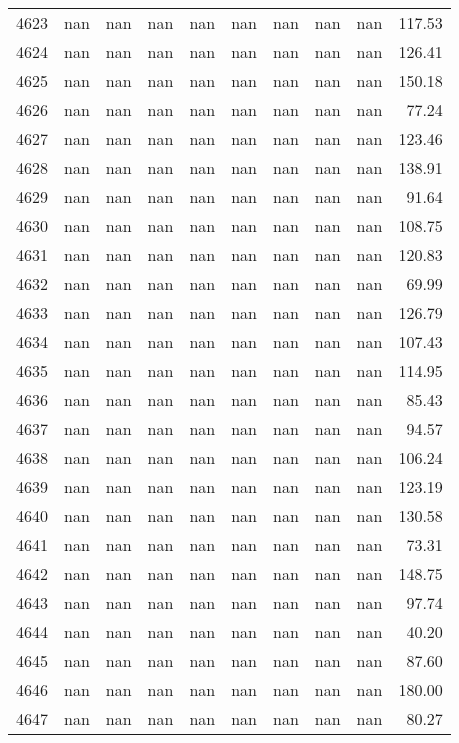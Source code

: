 \begin{tabular}{lrrrrrrrrr}
4623 & nan & nan & nan & nan & nan & nan & nan & nan & 117.53 \\
4624 & nan & nan & nan & nan & nan & nan & nan & nan & 126.41 \\
4625 & nan & nan & nan & nan & nan & nan & nan & nan & 150.18 \\
4626 & nan & nan & nan & nan & nan & nan & nan & nan & 77.24 \\
4627 & nan & nan & nan & nan & nan & nan & nan & nan & 123.46 \\
4628 & nan & nan & nan & nan & nan & nan & nan & nan & 138.91 \\
4629 & nan & nan & nan & nan & nan & nan & nan & nan & 91.64 \\
4630 & nan & nan & nan & nan & nan & nan & nan & nan & 108.75 \\
4631 & nan & nan & nan & nan & nan & nan & nan & nan & 120.83 \\
4632 & nan & nan & nan & nan & nan & nan & nan & nan & 69.99 \\
4633 & nan & nan & nan & nan & nan & nan & nan & nan & 126.79 \\
4634 & nan & nan & nan & nan & nan & nan & nan & nan & 107.43 \\
4635 & nan & nan & nan & nan & nan & nan & nan & nan & 114.95 \\
4636 & nan & nan & nan & nan & nan & nan & nan & nan & 85.43 \\
4637 & nan & nan & nan & nan & nan & nan & nan & nan & 94.57 \\
4638 & nan & nan & nan & nan & nan & nan & nan & nan & 106.24 \\
4639 & nan & nan & nan & nan & nan & nan & nan & nan & 123.19 \\
4640 & nan & nan & nan & nan & nan & nan & nan & nan & 130.58 \\
4641 & nan & nan & nan & nan & nan & nan & nan & nan & 73.31 \\
4642 & nan & nan & nan & nan & nan & nan & nan & nan & 148.75 \\
4643 & nan & nan & nan & nan & nan & nan & nan & nan & 97.74 \\
4644 & nan & nan & nan & nan & nan & nan & nan & nan & 40.20 \\
4645 & nan & nan & nan & nan & nan & nan & nan & nan & 87.60 \\
4646 & nan & nan & nan & nan & nan & nan & nan & nan & 180.00 \\
4647 & nan & nan & nan & nan & nan & nan & nan & nan & 80.27 \\

\end{tabular}
